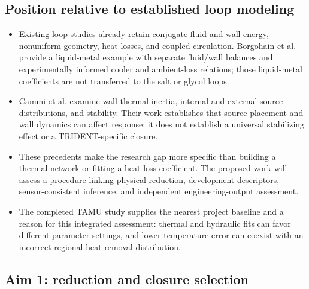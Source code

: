 \subsection{Position relative to established loop modeling}\label{subsec:position-relative-to-loop-modeling}
\begin{itemize}[leftmargin=*]
\item Existing loop studies already retain conjugate fluid and wall energy, nonuniform geometry, heat losses, and coupled circulation. Borgohain et al. provide a liquid-metal example with separate fluid/wall balances and experimentally informed cooler and ambient-loss relations; those liquid-metal coefficients are not transferred to the salt or glycol loops.\cite{borgohain2011naturalcirculation}
\item Cammi et al. examine wall thermal inertia, internal and external source distributions, and stability. Their work establishes that source placement and wall dynamics can affect response; it does not establish a universal stabilizing effect or a TRIDENT-specific closure.\cite{cammi2016wallinertia}
\item These precedents make the research gap more specific than building a thermal network or fitting a heat-loss coefficient. The proposed work will assess a procedure linking physical reduction, development descriptors, sensor-consistent inference, and independent engineering-output assessment.
\item The completed TAMU study supplies the nearest project baseline and a reason for this integrated assessment: thermal and hydraulic fits can favor different parameter settings, and lower temperature error can coexist with an incorrect regional heat-removal distribution.\cite{fierro2026cfdoneD}
\end{itemize}

\subsection{Aim 1: reduction and closure selection}\label{subsec:aim-1-reduction-and-closure-selection}

